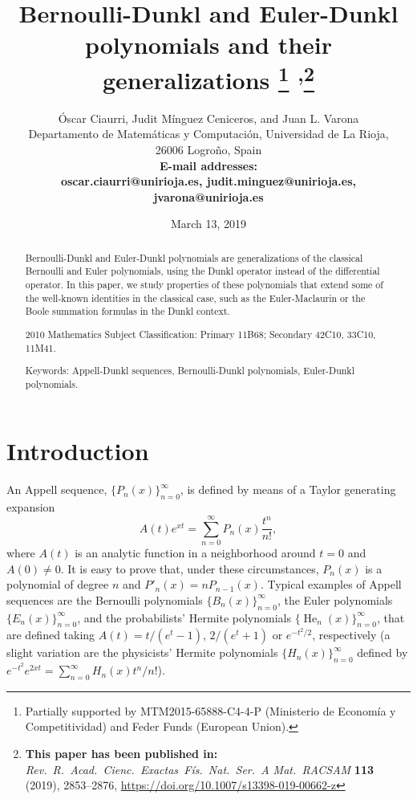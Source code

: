 \documentclass[10pt]{article}
\title{Bernoulli-Dunkl and Euler-Dunkl polynomials and their generalizations%
\footnote{Partially supported by MTM2015-65888-C4-4-P (Minis\-te\-rio de Eco\-no\-m\'ia y Com\-pe\-ti\-ti\-vi\-dad) and Feder Funds (European Union).}
\textsuperscript{,}\thanks{\textbf{This paper has been published in:} \textit{Rev.\ R.\ Acad.\ Cienc.\ Exactas\ F\'is.\ Nat.\ Ser.\ A Mat.\ RACSAM} \textbf{113} (2019), 2853--2876, \url{https://doi.org/10.1007/s13398-019-00662-z}}}
\author{\'Oscar Ciaurri, Judit M\'inguez Ceniceros, and Juan L. Varona\\[6pt]
\small Departamento de Matem\'aticas y Computaci\'on,
Universidad de La Rioja,\\[-2pt]
\small 26006 Logro\~no, Spain\\[6pt]
 \bfseries E-mail addresses:\\
 \normalsize {oscar.ciaurri@unirioja.es}, {judit.minguez@unirioja.es}, {jvarona@unirioja.es}}
\date{March 13, 2019}
\theoremstyle{plain}
\theoremstyle{definition}
\numberwithin{equation}{section} %
\begin{document}


\maketitle

\begin{abstract}
Bernoulli-Dunkl and Euler-Dunkl polynomials are generalizations of the classical Bernoulli and Euler polynomials, using the Dunkl operator instead of the differential operator. In this paper, we study properties of these polynomials that extend some of the well-known identities in the classical case, such as the Euler-Maclaurin or the Boole summation formulas in the Dunkl context.

2010 Mathematics Subject Classification: Primary 11B68; Secondary 42C10, 33C10, 11M41.

Keywords: Appell-Dunkl sequences, Bernoulli-Dunkl polynomials, Euler-Dunkl polynomials.
\end{abstract}


\section{Introduction}

An Appell sequence, $\{P_n(x)\}_{n=0}^{\infty}$, is defined by means of a Taylor generating expansion
\begin{equation}
\label{eq:As}
  A(t) e^{xt} = \sum_{n=0}^{\infty} P_n(x) \frac{t^n}{n!},
\end{equation}
where $A(t)$ is an analytic function in a neighborhood around $t=0$ and $A(0) \ne 0$.
It is easy to prove that, under these circumstances, $P_n(x)$ is a polynomial of degree $n$ and $P'_n(x) = nP_{n-1}(x)$.
Typical examples of Appell sequences are the Bernoulli polynomials $\{B_n(x)\}_{n=0}^{\infty}$, 
the Euler polynomials $\{E_n(x)\}_{n=0}^{\infty}$,
and the probabilists' Hermite polynomials $\{\operatorname{He}_n(x)\}_{n=0}^{\infty}$, that are defined taking
$A(t) = t/(e^t-1)$,  $2/(e^t+1)$ or $e^{-t^2/2}$, respectively
(a slight variation are the physicists' Hermite polynomials $\{H_n(x)\}_{n=0}^{\infty}$ defined by $e^{-t^2} e^{2xt} = \sum_{n=0}^{\infty} H_n(x) {t^n}/{n!}$).
\end{document}

